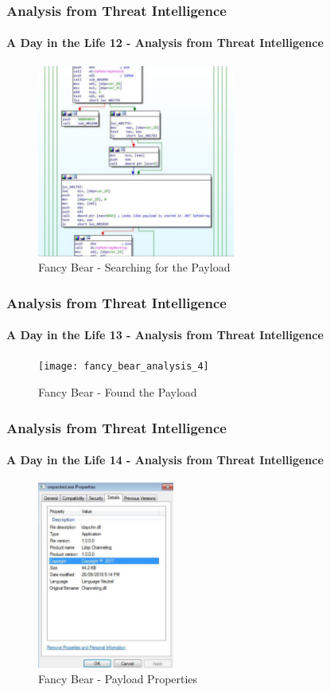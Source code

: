 \documentclass[aspectratio=169]{beamer}
\begin{document}
\begin{frame}
  \frametitle{Analysis from Threat Intelligence}
  \framesubtitle{A Day in the Life 12 - Analysis from Threat Intelligence}
  \begin{center}
    \begin{figure}
      \includegraphics[width=6.5cm,keepaspectratio]{fancy_bear_analysis_3}
      \caption{Fancy Bear - Searching for the Payload}
    \end{figure}
  \end{center}
\end{frame}

\begin{frame}
  \frametitle{Analysis from Threat Intelligence}
  \framesubtitle{A Day in the Life 13 - Analysis from Threat Intelligence}
  \begin{center}
    \begin{figure}
      \texttt{[image: fancy\_bear\_analysis\_4]}
      \caption{Fancy Bear - Found the Payload}
    \end{figure}
  \end{center}
\end{frame}

\begin{frame}
  \frametitle{Analysis from Threat Intelligence}
  \framesubtitle{A Day in the Life 14 - Analysis from Threat Intelligence}
  \begin{center}
    \begin{figure}
      \includegraphics[width=4.5cm,keepaspectratio]{fancy_bear_analysis_5}
      \caption{Fancy Bear - Payload Properties}
    \end{figure}
  \end{center}
\end{frame}
\end{document}
